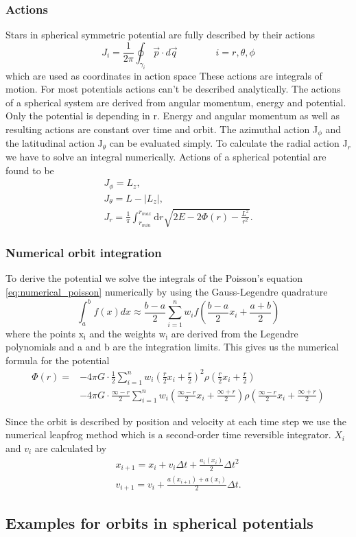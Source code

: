 \subsubsection{Actions}\label{sec:actions}

Stars in spherical symmetric potential are fully described by their actions \begin{equation}
J_i=\frac{1}{2\pi}\oint_{\gamma_i}\vec{p}\cdot d\vec{q} \qquad\qquad i=r,\theta,\phi
\end{equation} which are used as coordinates in action space
These actions are integrals of motion. For most potentials actions can't be described analytically. The actions of a spherical system are derived from angular momentum, energy and potential. Only the potential is depending in r. Energy and angular momentum as well as resulting actions are constant over time and orbit. The azimuthal action J\(_\phi\) and the latitudinal action J\(_\theta\) can be evaluated simply. To calculate the radial action J\(_r\) we have to solve an integral numerically. Actions of a spherical potential are found to be 
\begin{align}
J_\phi=L_z, \\ J_\theta=L-|L_z|, \\ J_r=\frac{1}{\pi} \int_{r_{min}}^{r_{max}} \mathrm{d}r \sqrt{2E-2\Phi(r)-\frac{L^2}{r^2}}. 
\end{align}

\subsubsection{Numerical orbit integration}\label{sec:num_int}
To derive the potential we solve the integrals of the Poisson's equation \eqref{eq:numerical_poisson} numerically by using the Gauss-Legendre quadrature 
\begin{equation}\label{eq:Gauss-Legendre}
\int_a^b f(x)dx \approx \frac{b-a}{2}\sum_{i=1}^n w_i f\left(\frac{b-a}{2}x_i+\frac{a+b}{2}\right)
\end{equation} where the points \(\mathrm{x_i}\) and the weights \(\mathrm{w_i}\) are derived from the Legendre polynomials and a and b are the integration limits. This gives us the numerical formula for the potential 
\begin{equation}\label{eq:numerical_potential}
\begin{aligned}
\Phi(r)= & -4\pi G \cdot \frac{1}{2}\sum_{i=1}^n  w_i\left(\frac{r}{2}x_i+\frac{r}{2}\right)^2\rho\left(\frac{r}{2} x_i+ \frac{r}{2}\right) \\
&-4\pi G\cdot\frac{\infty-r}{2}\sum_{i=1}^n w_i\left(\frac{\infty-r}{2} x_i +\frac{\infty+r}{2}\right)\rho\left(\frac{\infty-r}{2} x_i +\frac{\infty+r}{2}\right)
\end{aligned}
\end{equation}
\par Since the orbit is described by position and velocity at each time step we use the numerical leapfrog method which is a second-order time reversible integrator. \(X_i\) and \(v_i\) are calculated by 
\begin{align*}
x_{i+1}=x_i+v_i\Delta t+\frac{a_i(x_i)}{2}\Delta t^2 \\
v_{i+1}=v_i+\frac{a(x_{i+1})+a(x_i)}{2}\Delta t.
\end{align*}
\subsection{Examples for orbits in spherical potentials}\label{sec:orbit_examples}
